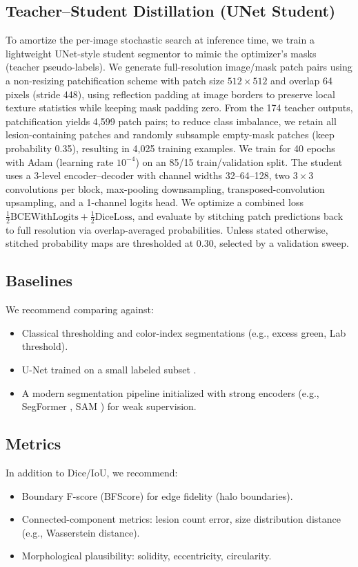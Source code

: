 \documentclass[journal]{IEEEtran}
\begin{document}
\subsection{Teacher--Student Distillation (UNet Student)}
To amortize the per-image stochastic search at inference time, we train a lightweight UNet-style student segmentor to mimic the optimizer's masks (teacher pseudo-labels).
We generate full-resolution image/mask patch pairs using a non-resizing patchification scheme with patch size $512\times512$ and overlap 64 pixels (stride 448), using reflection padding at image borders to preserve local texture statistics while keeping mask padding zero.
From the 174 teacher outputs, patchification yields 4{,}599 patch pairs; to reduce class imbalance, we retain all lesion-containing patches and randomly subsample empty-mask patches (keep probability 0.35), resulting in 4{,}025 training examples.
We train for 40 epochs with Adam (learning rate $10^{-4}$) on an 85/15 train/validation split.
The student uses a 3-level encoder--decoder with channel widths 32--64--128, two $3\times3$ convolutions per block, max-pooling downsampling, transposed-convolution upsampling, and a 1-channel logits head.
We optimize a combined loss $\tfrac12\mathrm{BCEWithLogits} + \tfrac12\mathrm{DiceLoss}$, and evaluate by stitching patch predictions back to full resolution via overlap-averaged probabilities. Unless stated otherwise, stitched probability maps are thresholded at 0.30, selected by a validation sweep.

\subsection{Baselines}
We recommend comparing against:
\begin{itemize}
    \item Classical thresholding and color-index segmentations (e.g., excess green, Lab threshold).
    \item U-Net trained on a small labeled subset \cite{ronneberger2015u}.
    \item A modern segmentation pipeline initialized with strong encoders (e.g., SegFormer \cite{xie2021segformer}, SAM \cite{kirillov2023segment}) for weak supervision.
\end{itemize}

\subsection{Metrics}
In addition to Dice/IoU, we recommend:
\begin{itemize}
    \item Boundary F-score (BFScore) for edge fidelity (halo boundaries).
    \item Connected-component metrics: lesion count error, size distribution distance (e.g., Wasserstein distance).
    \item Morphological plausibility: solidity, eccentricity, circularity.
\end{itemize}
\end{document}

